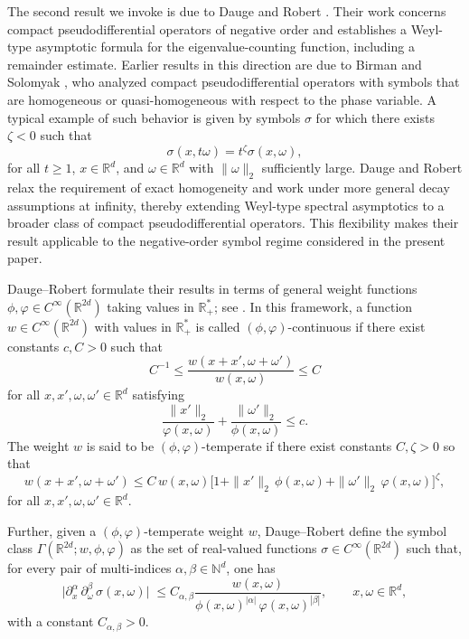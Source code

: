 \documentclass[a4paper,12pt]{article}
\newcommand{\N}{\mathbb{N}}
\newcommand{\R}{\mathbb{R}}
\begin{document}
The second result we invoke is due to Dauge and Robert \cite{dauge1987weyl}.
Their work concerns compact pseudodifferential operators of negative order and
establishes a Weyl-type asymptotic formula for the eigenvalue-counting function,
including a remainder estimate. Earlier results in this direction are due to Birman and Solomyak
\cite{birman_solomyak_1980_anisotropic}, who analyzed compact pseudodifferential
operators with symbols that are homogeneous or quasi-homogeneous with respect to
the phase variable.
A typical example of such behavior is given by symbols $\sigma$ for which there
exists $\zeta<0$ such that
\[
\sigma(x,t\omega)=t^{\zeta}\sigma(x,\omega),
\]
for all $t\ge1$, $x\in\R^d$, and $\omega\in\R^d$ with $\|\omega\|_2$ sufficiently
large. Dauge and Robert relax the requirement of exact homogeneity and work under more
general decay assumptions at infinity, thereby extending Weyl-type spectral
asymptotics to a broader class of compact pseudodifferential operators. This
flexibility makes their result applicable to the negative-order symbol regime
considered in the present paper.

Dauge--Robert formulate their results in terms of general weight functions
\(\phi,\varphi\in C^\infty(\R^{2d})\) taking values in \(\R_+^*\); see
\cite[Definition~1.1]{dauge1987weyl}.
In this framework, a function \(w\in C^\infty(\R^{2d})\) with values in \(\R_+^*\)
is called \((\phi,\varphi)\)-continuous if there exist constants \(c,C>0\) such that
\[
    C^{-1}
    \le
    \frac{w(x+x',\omega+\omega')}{w(x,\omega)}
    \le
    C
\]
for all \(x,x',\omega,\omega'\in\R^d\) satisfying
\[
    \frac{\|x'\|_2}{\varphi(x,\omega)}
    +
    \frac{\|\omega'\|_2}{\phi(x,\omega)}
    \le c .
\]
The weight \(w\) is said to be \((\phi,\varphi)\)-temperate if there exist constants
\(C,\zeta>0\) so that
\begin{equation}\label{eq:def-phi-phi-temperate}
    w(x+x',\omega+\omega')
    \le
    C\, w(x,\omega)
    \bigl[1+\|x'\|_2\,\phi(x,\omega)
          +\|\omega'\|_2\,\varphi(x,\omega)\bigr]^{\zeta},
\end{equation}
for all \(x,x',\omega,\omega'\in\R^d\).

Further, given a \((\phi,\varphi)\)-temperate weight \(w\), Dauge--Robert define the symbol
class \(\Gamma(\R^{2d};w,\phi,\varphi)\) as the set of real-valued functions
\(\sigma\in C^\infty(\R^{2d})\) such that, for every pair of multi-indices
\(\alpha,\beta\in\N^{d}\), one has
\begin{equation}\label{eq:weight-class-DR}
    \bigl|\partial_x^\alpha \, \partial_\omega^\beta \, \sigma(x,\omega)\bigr|
    \;\leq C_{\alpha,\beta}
    \frac{w(x,\omega)}
         {\phi(x,\omega)^{|\alpha|}\,\varphi(x,\omega)^{|\beta|}},
    \qquad x,\omega\in\R^d,
\end{equation}
with a constant $C_{\alpha,\beta} > 0$.
\end{document}
